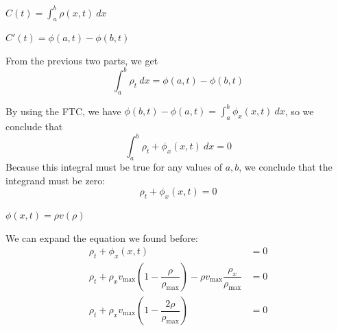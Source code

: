 \documentclass{workbook}
\begin{document}
\begin{solution}
\begin{slide}

\begin{parts}
	
	\item $\displaystyle C(t) = \int_a^b \rho(x,t) ~dx$
	\item $\displaystyle C'(t) = \phi(a,t) - \phi(b,t)$
	\item From the previous two parts, we get
	\[ 
		\int_a^b \rho_t ~dx = \phi(a,t) - \phi(b,t)
	\]

	By using the FTC, we have $\displaystyle \phi(b,t) - \phi(a,t) = \int_a^b \phi_x(x,t) ~dx$, so we conclude that
	\[ 
		\int_a^b \rho_t + \phi_x(x,t) ~dx = 0
	\]
	Because this integral must be true for any values of $a,b$, we conclude that the integrand must be zero:
	\[ 
		\rho_t + \phi_x(x,t) = 0
	\]	
	
	
	\item $\phi(x,t) = \rho v(\rho)$
	\item We can expand the equation we found before:
	\begin{align*}
		\rho_t + \phi_x(x,t) & = 0 \\
		\rho_t + \rho_x v_{\max} \left(1 - \dfrac{\rho}{\rho_{\max}}\right) - \rho v_{\max} \dfrac{\rho_x}{\rho_{\max}} & = 0 \\
		\rho_t + \rho_x v_{\max} \left(1 - \dfrac{2 \rho}{\rho_{\max}}\right) & = 0
	\end{align*}

\end{parts}
	
\end{slide}
	
\end{solution}
\end{document}
